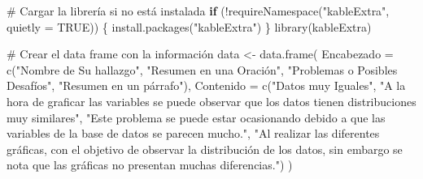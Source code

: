 \documentclass[
  letterpaper,
  DIV=11,
  numbers=noendperiod]{scrreprt}
\newenvironment{Shaded}{\begin{snugshade}}{\end{snugshade}}
\newcommand{\AttributeTok}[1]{\textcolor[rgb]{0.40,0.45,0.13}{#1}}
\newcommand{\CommentTok}[1]{\textcolor[rgb]{0.37,0.37,0.37}{#1}}
\newcommand{\ConstantTok}[1]{\textcolor[rgb]{0.56,0.35,0.01}{#1}}
\newcommand{\ControlFlowTok}[1]{\textcolor[rgb]{0.00,0.23,0.31}{\textbf{#1}}}
\newcommand{\FunctionTok}[1]{\textcolor[rgb]{0.28,0.35,0.67}{#1}}
\newcommand{\NormalTok}[1]{\textcolor[rgb]{0.00,0.23,0.31}{#1}}
\newcommand{\OtherTok}[1]{\textcolor[rgb]{0.00,0.23,0.31}{#1}}
\newcommand{\SpecialCharTok}[1]{\textcolor[rgb]{0.37,0.37,0.37}{#1}}
\newcommand{\StringTok}[1]{\textcolor[rgb]{0.13,0.47,0.30}{#1}}
\begin{document}
\begin{Shaded}
\begin{Highlighting}[]
\CommentTok{\# Cargar la librería si no está instalada}
\ControlFlowTok{if}\NormalTok{ (}\SpecialCharTok{!}\FunctionTok{requireNamespace}\NormalTok{(}\StringTok{"kableExtra"}\NormalTok{, }\AttributeTok{quietly =} \ConstantTok{TRUE}\NormalTok{)) \{}
  \FunctionTok{install.packages}\NormalTok{(}\StringTok{"kableExtra"}\NormalTok{)}
\NormalTok{\}}
\FunctionTok{library}\NormalTok{(kableExtra)}

\CommentTok{\# Crear el data frame con la información}
\NormalTok{data }\OtherTok{\textless{}{-}} \FunctionTok{data.frame}\NormalTok{(}
  \AttributeTok{Encabezado =} \FunctionTok{c}\NormalTok{(}\StringTok{"Nombre de Su hallazgo"}\NormalTok{, }
                 \StringTok{"Resumen en una Oración"}\NormalTok{, }
                 \StringTok{"Problemas o Posibles Desafíos"}\NormalTok{, }
                 \StringTok{"Resumen en un párrafo"}\NormalTok{),}
  \AttributeTok{Contenido =} \FunctionTok{c}\NormalTok{(}\StringTok{"Datos muy Iguales"}\NormalTok{, }
                \StringTok{"A la hora de graficar las variables se puede observar que los datos tienen distribuciones muy similares"}\NormalTok{, }
                \StringTok{"Este problema se puede estar ocasionando debido a que las variables de la base de datos se parecen mucho."}\NormalTok{, }
                \StringTok{"Al realizar las diferentes gráficas, con el objetivo de observar la distribución de los datos, sin embargo se nota que las gráficas no presentan muchas diferencias."}\NormalTok{)}
\NormalTok{)}


\end{Highlighting}
\end{Shaded}
\end{document}
